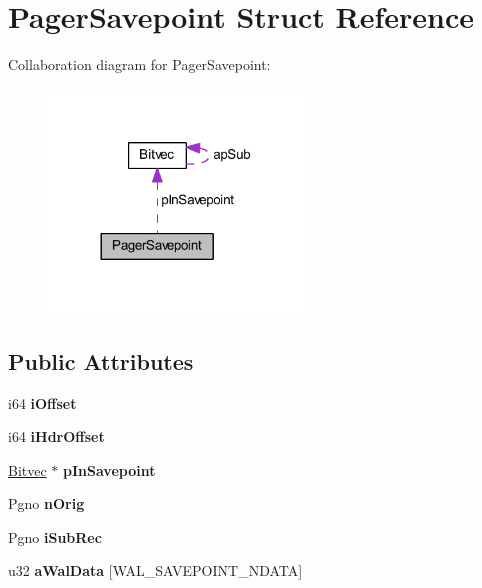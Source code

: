 \hypertarget{struct_pager_savepoint}{\section{Pager\-Savepoint Struct Reference}
\label{struct_pager_savepoint}
}


Collaboration diagram for Pager\-Savepoint\-:\nopagebreak
\begin{figure}[H]
\begin{center}
\leavevmode
\includegraphics[width=192pt]{struct_pager_savepoint__coll__graph}
\end{center}
\end{figure}
\subsection*{Public Attributes}
\begin{DoxyCompactItemize}
\item 
\hypertarget{struct_pager_savepoint_ab3ee7b75a10f47a82c8e3312bee6ad60}{i64 {\bfseries i\-Offset}}\label{struct_pager_savepoint_ab3ee7b75a10f47a82c8e3312bee6ad60}

\item 
\hypertarget{struct_pager_savepoint_ae1afd1cf4fba6f7efd232656366121d1}{i64 {\bfseries i\-Hdr\-Offset}}\label{struct_pager_savepoint_ae1afd1cf4fba6f7efd232656366121d1}

\item 
\hypertarget{struct_pager_savepoint_abf7d6dc9d457c866727f84c4b9e0348f}{\hyperlink{struct_bitvec}{Bitvec} $\ast$ {\bfseries p\-In\-Savepoint}}\label{struct_pager_savepoint_abf7d6dc9d457c866727f84c4b9e0348f}

\item 
\hypertarget{struct_pager_savepoint_a944cca2844a51bdba253476f516b9865}{Pgno {\bfseries n\-Orig}}\label{struct_pager_savepoint_a944cca2844a51bdba253476f516b9865}

\item 
\hypertarget{struct_pager_savepoint_ac1accce313b9da31631892e2cbe85a2f}{Pgno {\bfseries i\-Sub\-Rec}}\label{struct_pager_savepoint_ac1accce313b9da31631892e2cbe85a2f}

\item 
\hypertarget{struct_pager_savepoint_ac96cff844a24378c426a9901517f1d6c}{u32 {\bfseries a\-Wal\-Data} \mbox{[}W\-A\-L\-\_\-\-S\-A\-V\-E\-P\-O\-I\-N\-T\-\_\-\-N\-D\-A\-T\-A\mbox{]}}\label{struct_pager_savepoint_ac96cff844a24378c426a9901517f1d6c}

\end{DoxyCompactItemize}


